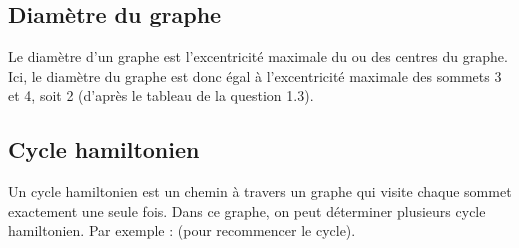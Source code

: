 \documentclass{article}
\begin{document}
\subsection{Diamètre du graphe}
\bigskip
Le diamètre d'un graphe est l'excentricité maximale du ou des centres du graphe. Ici, le diamètre du graphe est donc égal à l'excentricité maximale des sommets 3 et 4, soit 2 (d'après le tableau de la question 1.3).
\bigskip

\subsection{Cycle hamiltonien}
\bigskip
Un cycle hamiltonien est un chemin à travers un graphe qui visite chaque sommet exactement une seule fois. Dans ce graphe, on peut déterminer plusieurs cycle hamiltonien.
\newline
Par exemple : 
         (pour recommencer le cycle). 
\newpage
\end{document}
